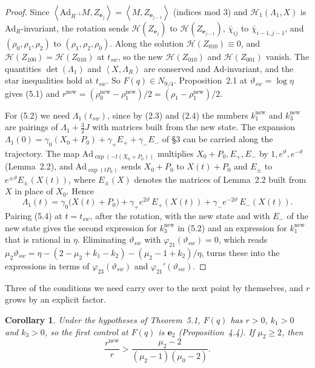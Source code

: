 \documentclass[11pt,a4paper]{article}
\theoremstyle{plain}
\newtheorem{corollary}[theorem]{Corollary}
\theoremstyle{definition}
\theoremstyle{remark}
\newcommand{\bracks}[2]{\left\langle #1,#2\right\rangle}
\newcommand{\Ad}{\mathrm{Ad}}
\renewcommand{\H}{\mathcal{H}}
\newcommand{\ep}{\mathbf{e}}
\newcommand{\cl}{\bar\chi}
\newcommand{\nw}{^{\mathrm{new}}}
\newcommand{\sw}{_{sw}}
\begin{document}
\begin{proof}
Since $\bracks{\Ad_{R^{-1}}M}{Z_{\ep_j}}=\bracks M{Z_{\ep_{j-1}}}$ (indices mod 3) and
$\H_1(\Lambda_1,X)$ is $\Ad_R$-invariant, the rotation sends $\H(Z_{\ep_j})$ to
$\H(Z_{\ep_{j-1}})$, $\cl_{ij}$ to $\cl_{i-1,j-1}$, and $(\rho_0,\rho_1,\rho_2)$ to
$(\rho_1,\rho_2,\rho_0)$. Along the solution $\H(Z_{010})\equiv0$, and
$\H(Z_{100})=\H(Z_{010})$ at $t\sw$, so the new $\H(Z_{010})$ and $\H(Z_{001})$ vanish. The
quantities $\det(\Lambda_1)$ and $\bracks X{\Lambda_R}$ are conserved and $\Ad$-invariant, and the
star inequalities hold at $t\sw$. So $F(q)\in N_{9/4}$. Proposition~2.1 at $\vartheta\sw=\log\eta$
gives (5.1) and $r\nw=(\rho_0\nw-\rho_1\nw)/2=(\rho_1-\rho_1\nw)/2$.

For (5.2) we need $\Lambda_1(t\sw)$, since by (2.3) and (2.4) the numbers $k_1\nw$ and $k_3\nw$
are pairings of $\Lambda_1+\frac32J$ with matrices built from the new state. The expansion
$\Lambda_1(0)=\gamma_0(X_0+P_0)+\gamma_+E_++\gamma_-E_-$ of \S3 can be carried along the
trajectory. The map $\Ad_{\exp(-t(X_0+P_0))}$ multiplies $X_0+P_0,E_+,E_-$ by
$1,e^{\vartheta},e^{-\vartheta}$ (Lemma~2.2), and $\Ad_{\exp(tP_0)}$ sends $X_0+P_0$ to
$X(t)+P_0$ and $E_\pm$ to $e^{\pm\vartheta}E_\pm(X(t))$, where $E_\pm(X)$ denotes the matrices of
Lemma~2.2 built from $X$ in place of $X_0$. Hence
\begin{equation}\tag{5.4}
\Lambda_1(t)=\gamma_0\bigl(X(t)+P_0\bigr)+\gamma_+e^{2\vartheta}\,E_+(X(t))
+\gamma_-e^{-2\vartheta}\,E_-(X(t)) .
\end{equation}
Pairing (5.4) at $t=t\sw$, after the rotation, with the new state and with $E_-$ of the new state
gives the second expression for $k_3\nw$ in (5.2) and an expression for $k_1\nw$ that is rational
in $\eta$. Eliminating $\vartheta\sw$ with $\varphi_{21}(\vartheta\sw)=0$, which reads
$\mu_2\vartheta\sw=\eta-(2-\mu_2+k_1-k_2)-(\mu_2-1+k_2)/\eta$, turns these into the expressions in
terms of $\varphi_{23}(\vartheta\sw)$ and $\varphi_{21}'(\vartheta\sw)$.
\end{proof}

Three of the conditions we need carry over to the next point by themselves, and $r$ grows by an
explicit factor.

\begin{corollary}
Under the hypotheses of Theorem~5.1, $F(q)$ has $r>0$, $k_1>0$ and $k_3>0$, so the first control
at $F(q)$ is $\ep_2$ \textup{(}Proposition~4.4\textup{)}. If $\mu_2\ge2$, then
\begin{equation}\tag{5.3}
\frac{r\nw}{r}>\frac{\mu_2-2}{(\mu_2-1)(\mu_0-2)} .
\end{equation}
\end{corollary}
\end{document}
